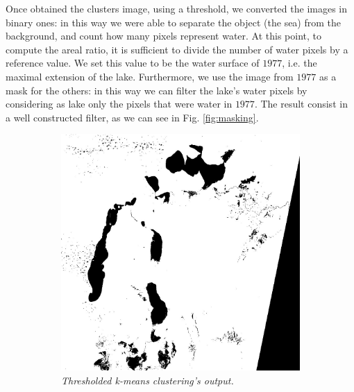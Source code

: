 Once obtained the clusters image, using a threshold, we converted the images in binary ones: in this way we were able to separate the object (the sea) from the background, and count how many pixels represent water. 
At this point, to compute the areal ratio, it is sufficient to divide the number of water pixels by a reference value. 
We set this value to be the water surface of $1977$, i.e. the maximal extension of the lake. 
Furthermore, we use the image from $1977$ as a mask for the others: in this way we can filter the lake's water pixels by considering as lake only the pixels that were water in $1977$.
The result consist in a well constructed filter, as we can see in Fig. \ref{fig:masking}.
\begin{figure}[H]
    \centering
    \begin{subfigure}[b]{.45\textwidth}
        \includegraphics[width=\textwidth]{../img/2015_with_noise.jpg}
        \caption{\emph{Thresholded k-means clustering's output.}}
    \end{subfigure}
    \begin{subfigure}[b]{.45\textwidth}

\end{subfigure}
\end{figure}
